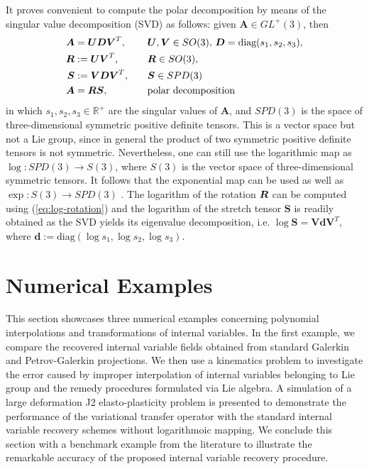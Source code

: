\documentclass[12pt]{article}
\newcommand{\mbs}[1]{\boldsymbol{#1}}
\newcommand{\mbb}[1]{\mathbb{#1}}
\def\bA{{\mbs{A}}} \def\bB{{\mbs{B}}} \def\bC{{\mbs{C}}}
\def\bD{{\mbs{D}}} \def\bE{{\mbs{E}}} \def\bF{{\mbs{F}}}
\def\bS{{\mbs{S}}} \def\bT{{\mbs{T}}} \def\bU{{\mbs{U}}}
\def\bV{{\mbs{V}}} \def\bW{{\mbs{W}}} \def\bX{{\mbs{X}}}
\def\bd{{\mbs{d}}} \def\be{{\mbs{e}}} \def\fb{{\mbs{f}}}
\begin{document}
It proves convenient to compute the polar decomposition by means of
the singular value decomposition (SVD) as follows: given $\bA \in
GL^+(3)$, then
\begin{align}
  \bA & = \bU \bD \bV^T, & \quad & \bU, \bV \in SO(3), \,
  \bD = \text{diag}(s_1,s_2,s_3), \label{eq:SVD-polar-1}
  \\
  \bR & := \bU \bV^T, & \quad & \bR \in SO(3),
  \\
  \bS & := \bV \bD \bV^T, & \quad & \bS \in SPD(3)
  \\
  \bA & = \bR \bS, & \quad
  & \text{polar decomposition} \label{eq:SVD-polar-4}
\end{align}
in which $s_1,s_2,s_3 \in \mbb{R}^+$ are the singular values of $\bA$,
and $SPD(3)$ is the space of three-dimensional symmetric positive
definite tensors. This is a vector space but not a Lie group, since in
general the product of two symmetric positive definite tensors is not
symmetric. Nevertheless, one can still use the logarithmic map as
$\log: SPD(3) \rightarrow S(3)$, where $S(3)$ is the vector space of
three-dimensional symmetric tensors. It follows that the exponential
map can be used as well as $\exp: S(3) \rightarrow SPD(3)$
\citep{Gallier:2011}. The logarithm of the rotation $\bR$ can be
computed using (\ref{eq:log-rotation}) and the logarithm of the
stretch tensor $\bS$ is readily obtained as the SVD yields its
eigenvalue decomposition, i.e. $\log \bS = \bV \bd \bV^T$, where $\bd
:= \text{diag}(\log s_1, \log s_2, \log s_3)$.

\section{Numerical Examples}
This section showcases three numerical examples concerning polynomial
interpolations and transformations of internal variables. In the first
example, we compare the recovered internal variable fields obtained
from standard Galerkin and Petrov-Galerkin projections. We then use a
kinematics problem to investigate the error caused by improper
interpolation of internal variables belonging to Lie group and the
remedy procedures formulated via Lie algebra. A simulation of a large
deformation J2 elasto-plasticity problem is presented to demonstrate 
the performance of the variational transfer operator  with the 
standard internal variable recovery schemes without logarithmoic mapping. 
We conclude this section with a benchmark
example from the literature to illustrate the remarkable accuracy of
the proposed internal variable recovery procedure.
\end{document}
